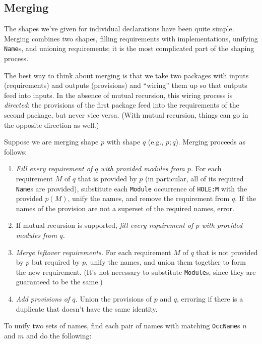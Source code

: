 \documentclass{article}
\begin{document}
\newpage

\subsection{Merging}

The shapes we've given for individual declarations have been quite
simple.  Merging combines two shapes, filling requirements with
implementations, unifying \verb|Name|s, and unioning requirements; it is
the most complicated part of the shaping process.

The best way to think about merging is that we take two packages with
inputs (requirements) and outputs (provisions) and ``wiring'' them up so
that outputs feed into inputs.  In the absence
of mutual recursion, this wiring process is \emph{directed}: the provisions
of the first package feed into the requirements of the second package,
but never vice versa.  (With mutual recursion, things can go in the opposite
direction as well.)

Suppose we are merging shape $p$ with shape $q$ (e.g., $p; q$).  Merging
proceeds as follows:

\begin{enumerate}
    \item \emph{Fill every requirement of $q$ with provided modules from
        $p$.} For each requirement $M$ of $q$ that is provided by $p$ (in particular,
        all of its required \verb|Name|s are provided),
        substitute each \verb|Module| occurrence of \verb|HOLE:M| with the
        provided $p(M)$, unify the names, and remove the requirement from $q$.
        If the names of the provision are not a superset of the required names, error.
    \item If mutual recursion is supported, \emph{fill every requirement of $p$ with provided modules from $q$.}
    \item \emph{Merge leftover requirements.}  For each requirement $M$ of $q$ that is not
        provided by $p$ but required by $p$, unify the names, and union them together to form the new requirement.  (It's not
        necessary to substitute \verb|Module|s, since they are guaranteed to be the same.)
    \item \emph{Add provisions of $q$.} Union the provisions of $p$ and $q$, erroring
        if there is a duplicate that doesn't have the same identity.
\end{enumerate}
%
To unify two sets of names, find each pair of names with matching \verb|OccName|s $n$ and $m$ and do the following:
\end{document}
